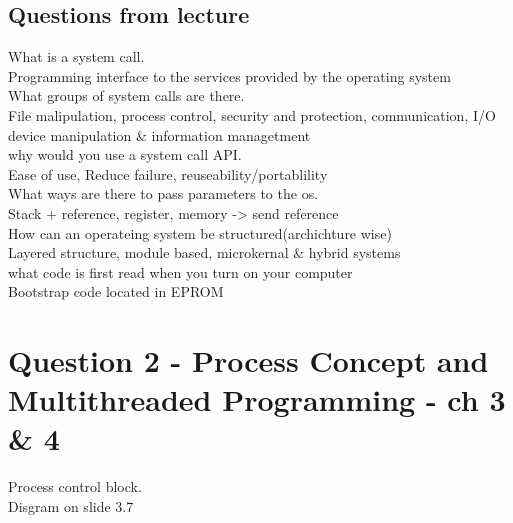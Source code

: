 \documentclass[a4paper,10pt,titlepage]{report}
\begin{document}
\subsection{Questions from lecture}
What is a system call.\\
\hspace{10mm} Programming interface to the services provided by the operating system \\ \vspace{5mm}
What groups of system calls are there. \\
\hspace{10mm}File malipulation, process control, security and protection, communication, I/O device manipulation \& information managetment\\ \vspace{5mm}
why would you use a system call API.\\
\hspace{10mm}Ease of use, Reduce failure, reuseability/portablility \\ \vspace{5mm}
What ways are there to pass parameters to the os.\\
\hspace{10mm} Stack + reference, register, memory -> send reference \\  \vspace{5mm}
How can an operateing system be structured(archichture wise)\\
\hspace{10mm} Layered structure, module based, microkernal \& hybrid systems\\ \vspace{5mm} 
what code is first read when you turn on your computer\\
\hspace{10mm}Bootstrap code located in EPROM \\ \vspace{5mm}

\newpage
\section{Question 2 - Process Concept and Multithreaded Programming - ch 3 \& 4}
Process control block. \\ Disgram on slide 3.7
\end{document}
